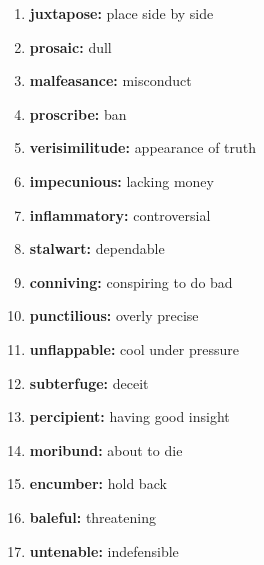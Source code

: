 \documentclass{article}
\begin{document}
\begin{enumerate}
    \item \textbf{juxtapose: }{place side by side}
    \item \textbf{prosaic: }{dull}
    \item \textbf{malfeasance: }{misconduct}
    \item \textbf{proscribe: }{ban}
    \item \textbf{verisimilitude: }{appearance of truth}
    \item \textbf{impecunious: }{lacking money}
    \item \textbf{inflammatory: }{controversial}
    \item \textbf{stalwart: }{dependable}
    \item \textbf{conniving: }{conspiring to do bad}
    \item \textbf{punctilious: }{overly precise}
    \item \textbf{unflappable: }{cool under pressure}
    \item \textbf{subterfuge: }{deceit}
    \item \textbf{percipient: }{having good insight}
    \item \textbf{moribund: }{about to die}
    \item \textbf{encumber: }{hold back}
    \item \textbf{baleful: }{threatening}
    \item \textbf{untenable: }{indefensible}
    
\end{enumerate}
\end{document}
